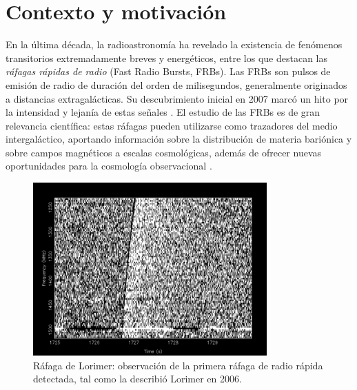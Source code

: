 
\section{Contexto y motivación}
En la última década, la radioastronomía ha revelado la existencia de fenómenos transitorios extremadamente breves y energéticos, entre los que destacan las \textit{ráfagas rápidas de radio} (Fast Radio Bursts, FRBs). Las FRBs son pulsos de emisión de radio de duración del orden de milisegundos, generalmente originados a distancias extragalácticas. Su descubrimiento inicial en 2007 marcó un hito por la intensidad y lejanía de estas señales \cite{Lorimer_2007}. El estudio de las FRBs es de gran relevancia científica: estas ráfagas pueden utilizarse como trazadores del medio intergaláctico, aportando información sobre la distribución de materia bariónica y sobre campos magnéticos a escalas cosmológicas, además de ofrecer nuevas oportunidades para la cosmología observacional \cite{Petroff_2022}. 

\begin{figure}[h]
\centering
\includegraphics[width=0.8\textwidth]{figures/Lorimer Burst.png}
\caption{\label{fig:lorimer} Ráfaga de Lorimer: observación de la primera ráfaga de radio rápida detectada, tal como la describió Lorimer en 2006.}
\end{figure}

